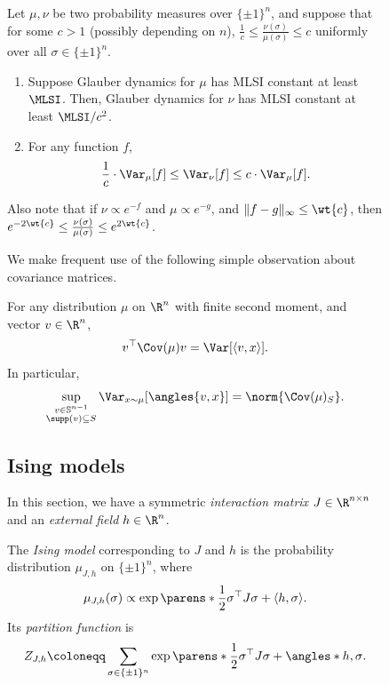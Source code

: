 \documentclass[11pt,letterpaper]{article}
\begin{document}
\begin{figure}
    \begin{lemma}\label{lem:mlsi-bdd-density-relate}
      Let $\mu,\nu$ be two probability measures over $\{\pm1\}^{n}$, and suppose that for some $c > 1$ (possibly depending on $n$), $\frac{1}{c} \leq \frac{\nu(\sigma)}{\mu(\sigma)} \leq c$ uniformly over all $\sigma \in \{\pm1\}^{n}$.
      \begin{enumerate}
          \item Suppose Glauber dynamics for $\mu$ has MLSI constant at least $\MLSI$. Then, Glauber dynamics for $\nu$ has MLSI constant at least $\MLSI / c^2$.
          \item For any function $f$,
          \[ \frac{1}{c} \cdot \Var_{\mu}[f] \le \Var_{\nu}[f] \le c \cdot \Var_{\mu}[f]. \]
      \end{enumerate}
      Also note that if $\nu \propto e^{-f}$ and $\mu \propto e^{-g}$, and $\|f-g\|_{\infty} \le \wt{c}$, then $e^{-2\wt{c}} \le \frac{\nu(\sigma)}{\mu(\sigma)} \le e^{2\wt{c}}$.
    \end{lemma}

    We make frequent use of the following simple observation about covariance matrices.
    \begin{observation}\label{fact:var-cov}
        For any distribution $\mu$ on $\R^n$ with finite second moment, and vector $v \in \R^n$,
        \[ v^\top \Cov(\mu) v = \Var[\langle v,x\rangle]. \]
        In particular, 
        \[
            \sup_{\substack{v \in \mathbb{S}^{n-1} \\ \supp(v) \subseteq S}} \Var_{x \sim \mu}[\angles{v, x}] = \norm{\Cov(\mu)_S}.
        \]
    \end{observation}


\subsection{Ising models}
    In this section, we have a symmetric \emph{interaction matrix} $J\in\R^{n\times n}$ and an \emph{external field} $h\in\R^n$. 
    \begin{definition}
        The \emph{Ising model} corresponding to $J$ and $h$ is the probability distribution $\mu_{J, h}$ on $\{\pm1\}^n$, where
        \[
            \mu_{J, h}(\sigma) \propto \exp\parens*{\frac{1}{2}\sigma^\top J \sigma + \langle h,\sigma\rangle}.
        \]
        Its \emph{partition function} is
        \[
            Z_{J, h} \coloneqq \sum_{\sigma\in\{\pm1\}^n} \exp\parens*{\frac{1}{2}\sigma^{\top} J\sigma + \angles*{h,\sigma}}.    
        \]
    \end{definition}


\end{figure}
\end{document}
